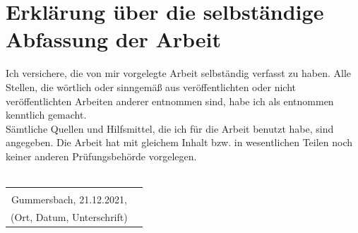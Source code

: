 \documentclass[a4paper,12pt,oneside]{article}
\begin{document}
\pagestyle{empty}
\section*{Erklärung über die selbständige\\Abfassung der Arbeit} %
Ich versichere, die von mir vorgelegte Arbeit selbständig verfasst zu haben.
Alle Stellen, die wörtlich oder sinngemäß aus veröffentlichten oder nicht veröffentlichten Arbeiten anderer entnommen sind,
habe ich als entnommen kenntlich gemacht.\\
Sämtliche Quellen und Hilfsmittel, die ich für die Arbeit benutzt habe, sind
angegeben. Die Arbeit hat mit gleichem Inhalt bzw. in wesentlichen Teilen noch keiner anderen Prüfungsbehörde vorgelegen.\\\\
\begin{tabular}{cp{7cm}}
                                    &             \\
      Gummersbach, 21.12.2021,       &             \\ \hline
  \small (Ort, Datum, Unterschrift) & \normalsize \\
\end{tabular}
   

\newpage
\thispagestyle{empty}

\end{document}
